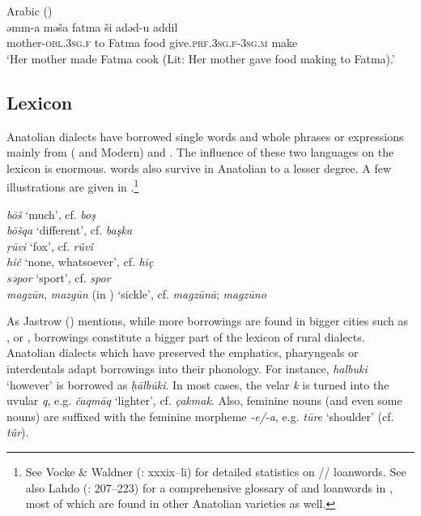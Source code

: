\documentclass[output=paper]{langsci/langscibook}
\begin{document}
\begin{exe}
\ex \label{persa}
 Arabic (\citealt[221]{Taylan2017})\\
\gll  	əmm-a mə\v{s}a fatma \v{s}i adəd-u    	addil	\\
  mother-\textsc{obl.3sg.f} to Fatma food      give.\textsc{prf.3sg.f-3sg.m}	make	 \\
        \glt `Her mother made Fatma cook (Lit: Her mother gave food making to Fatma).'
\end{exe}



\subsection{Lexicon}

Anatolian  dialects have borrowed single words and whole phrases or expressions mainly from ( and Modern)  and . The influence of these two languages on the  lexicon is enormous.  words also survive in Anatolian  to a lesser degree. A few illustrations are given in .\footnote{See Vocke \& Waldner (\citeyear{VockeWaldner1982}: xxxix--li) for detailed statistics on // {loanwords}. See also Lahdo (\citeyear{Lahdo2009}: 207--223) for a comprehensive glossary of  and  {loanwords} in  , most of which are found in other Anatolian  varieties as well.}


\ea \label{lex}
\noindent \textit{b\={o}\v{s}} `much', cf.  \textit{bo\c{s}}\\
\textit{b\={o}\v{s}qa} `different', cf.  \textit{ba\c{s}ka}\\
\textit{\d{r}\={u}vi} `fox', cf.  \textit{rûvî}\\
\textit{hi\v{c}} `none, whatsoever', cf.  \textit{hī\c{c}}\\
\textit{səpor} `sport', cf.  \textit{spor}\\
\textit{magz\={u}n}, \textit{mazg\={u}n} (in ) `sickle', cf.  \textit{magz\={u}n\={a}};  \textit{magz\={u}no}\\
\z

\noindent As Jastrow (\citeyear[95]{Jastrow2011anatolian}) mentions, while more  borrowings are found in bigger cities such as ,  or ,  borrowings constitute a bigger part of the lexicon of rural dialects. Anatolian  dialects which have preserved the emphatics, {pharyngeals} or interdentals adapt borrowings into their phonology. For instance,  \textit{halbuki} `however' is borrowed as \textit{\d{h}\={a}lb\={u}ki}. In most cases, the velar \textit{k} is turned into the uvular \textit{q}, e.g. \textit{\v{c}aqm\={a}q} `lighter', cf.  \textit{\c{c}akmak}. Also,  feminine nouns (and even some  nouns) are suffixed with the  feminine morpheme \textit{-e/-a}, e.g. \textit{t\={u}re} `shoulder' (cf.  \textit{t\^{u}r}).
\end{document}
